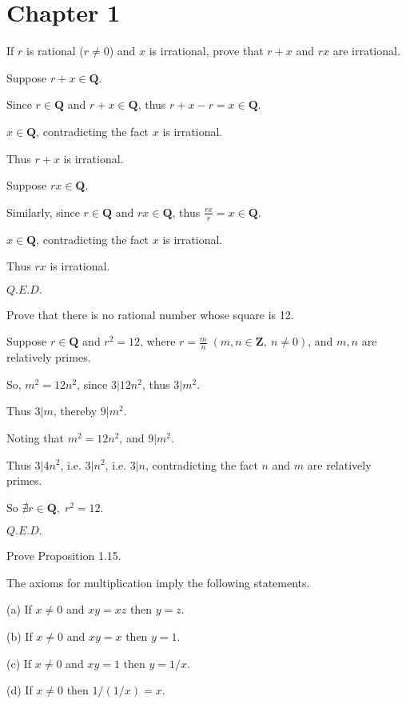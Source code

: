 \section{ Chapter 1 }

\bigskip\bigskip\bigskip

\begin{question}{}{}
If $r$ is rational ($r\neq0$) and $x$ is irrational,
prove that $r+x$ and $rx$ are irrational.
\end{question}
\begin{Proof}
Suppose $r+x\in\mathbf{Q}$.

Since $r\in\mathbf{Q}$  and $r+x\in\mathbf{Q}$, 
thus $r+x-r=x\in\mathbf{Q}$.

$x\in\mathbf{Q}$,
contradicting the fact $x$ is irrational.

Thus $r+x$ is irrational.\bigskip

Suppose $rx\in\mathbf{Q}$.

Similarly, since $r\in\mathbf{Q}$ and $rx\in\mathbf{Q}$,
thus $\frac{rx}{r}=x\in\mathbf{Q}$.

$x\in\mathbf{Q}$,
contradicting the fact $x$ is irrational.

Thus $rx$ is irrational.

\hfill$Q.E.D.$\qedhere\hspace{42pt}
\end{Proof}
\begin{question}{}{}
Prove that there is no rational number whose square is 12.
\end{question}
\begin{Proof}
Suppose $r\in\mathbf{Q}$ and $r^2=12$,
where $r=\frac{m}{n}\; (m,n\in\mathbf{Z},\:n\neq0)$, 
and $m,n$ are relatively primes.

So, $m^2=12n^2$,
since $3|12n^2$, thus $3|m^2$.

Thus $3|m$, thereby $9|m^2$.

Noting that $m^2=12n^2$, and $9|m^2$.

Thus $3|4n^2$, i.e. $3|n^2$, i.e. $3|n$,
contradicting the fact $n$ and $m$ are relatively primes.

So $\nexists r\in\mathbf{Q},\;r^2=12$.

\hfill$Q.E.D.$\qedhere\hspace{42pt}

\end{Proof}
\begin{question}{}{}
Prove Proposition 1.15.
\end{question}
\begin{proposition}{1.15}{}
\itshape{
The axioms for multiplication imply the following statements. 

(a) If $x\neq0$ and $xy=xz$ then $y=z$. 

(b) If $x\neq0$ and $xy=x$ then $y=1$. 

(c) If $x\neq0$ and $xy=1$ then $y=1/x$. 

(d) If $x\neq0$ then $1/(1/x)=x$.
}
\end{proposition}
